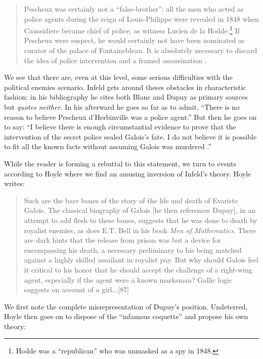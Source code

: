\documentclass[12pt]{article}
\begin{document}
\begin{quote}
Pescheux was certainly not a ``false-brother'': all the men who acted as police agents during the reign of Louis-Philippe were revealed in 1848 when Caussidiere became chief of police, as witness Lucien de la Hodde.\footnote{Hodde was a ``republican'' who was unmasked as a spy in 1848.} If Pescheux were suspect, he would certainly not have been nominated as curator of the palace of Fontainebleau. It is absolutely necessary to discard the idea of police intervention and a framed assassination \cite{85}.
\end{quote}
We see that there are, even at this level, some serious difficulties with the political enemies scenario. Infeld gets around theses obstacles in characteristic fashion: in his bibliography he cites both Blanc and Dupuy as primary sources but {\it quotes neither.} In his afterward he goes so far as to admit, ``There is no reason to believe Pescheux d'Herbinville was a police agent.'' But then he goes on to say: ``I believe there is enough circumstantial evidence to prove that the intervention of the secret police sealed Galois's fate. I do not believe it is possible to fit all the known facts without assuming Galois was murdered \cite{86}.''

While the reader is forming a rebuttal to this statement, we turn to events according to Hoyle where we find an amusing inversion of Infeld's theory. Hoyle writes:

\begin{quote}
Such are the bare bones of the story of the life and death of Evariste Galois. The classical biography of Galois [he then references Dupuy], in an attempt to add flesh to these bones, suggests that he was done to death by royalist enemies, as does E.T. Bell in his book\emph{ Men of Mathematics}. There are dark hints that the release from prison was but a device for encompassing his death, a necessary preliminary to his being matched against a highly skilled assailant in royalist pay. But why should Galois feel it critical to his honor that he should accept the challenge of a right-wing agent, especially if the agent were a known marksman? Gallic logic suggests on account of a girl...[87]
\end{quote}
We first note the complete misrepresentation of Dupuy's position. Undeterred, Hoyle then goes on to dispose of the ``infamous coquette'' and propose his own theory:
\end{document}
